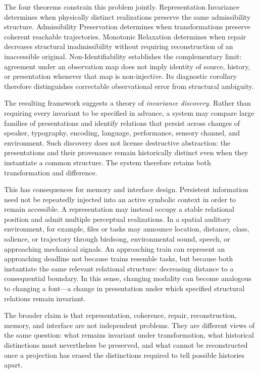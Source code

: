 \documentclass[11pt]{book}
\begin{document}
The four theorems constrain this problem jointly. Representation
Invariance determines when physically distinct realizations preserve the
same admissibility structure. Admissibility Preservation determines when
transformations preserve coherent reachable trajectories. Monotonic
Relaxation determines when repair decreases structural inadmissibility
without requiring reconstruction of an inaccessible original.
Non-Identifiability establishes the complementary limit: agreement under
an observation map does not imply identity of source, history, or
presentation whenever that map is non-injective. Its diagnostic corollary
therefore distinguishes correctable observational error from structural
ambiguity.

The resulting framework suggests a theory of \emph{invariance discovery}.
Rather than requiring every invariant to be specified in advance, a system
may compare large families of presentations and identify relations that
persist across changes of speaker, typography, encoding, language,
performance, sensory channel, and environment. Such discovery does not
license destructive abstraction: the presentations and their provenance
remain historically distinct even when they instantiate a common
structure. The system therefore retains both transformation and
difference.

This has consequences for memory and interface design. Persistent
information need not be repeatedly injected into an active symbolic
context in order to remain accessible. A representation may instead
occupy a stable relational position and admit multiple perceptual
realizations. In a spatial auditory environment, for example, files or
tasks may announce location, distance, class, salience, or trajectory
through birdsong, environmental sound, speech, or approaching mechanical
signals. An approaching train can represent an approaching deadline not
because trains resemble tasks, but because both instantiate the same
relevant relational structure: decreasing distance to a consequential
boundary. In this sense, changing modality can become analogous to
changing a font---a change in presentation under which specified
structural relations remain invariant.

The broader claim is that representation, coherence, repair,
reconstruction, memory, and interface are not independent problems.
They are different views of the same question: what remains invariant
under transformation, what historical distinctions must nevertheless be
preserved, and what cannot be reconstructed once a projection has erased
the distinctions required to tell possible histories apart.
\end{document}
